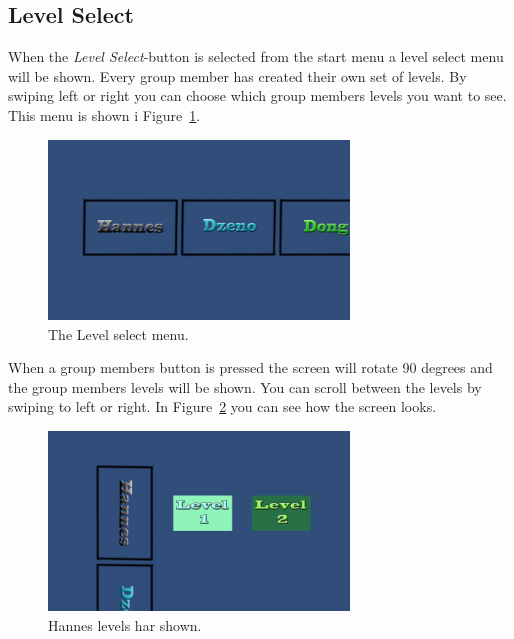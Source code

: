 \documentclass[12pt, a4paper]{article}
\begin{document}
\subsection{Level Select}
When the \textit{Level Select}-button is selected from the start menu a level select menu will be shown. Every group member has created their own set of levels. By swiping left or right you can choose which group members levels you want to see. This menu is shown i Figure~\ref{fig:levelselect}.

\begin{figure}[ht!]
    \centering
    \includegraphics[width=8cm]{levelselect.jpg}
    \caption{The Level select menu.}
    \label{fig:levelselect}
\end{figure}

When a group members button is pressed the screen will rotate 90 degrees and the group members levels will be shown. You can scroll between the levels by swiping to left or right. In Figure~\ref{fig:levelselect2} you can see how the screen looks.

\begin{figure}[ht!]
    \centering
    \includegraphics[width=8cm]{levelselect2.jpg}
    \caption{Hannes levels har shown.}
    \label{fig:levelselect2}
\end{figure}
\end{document}
